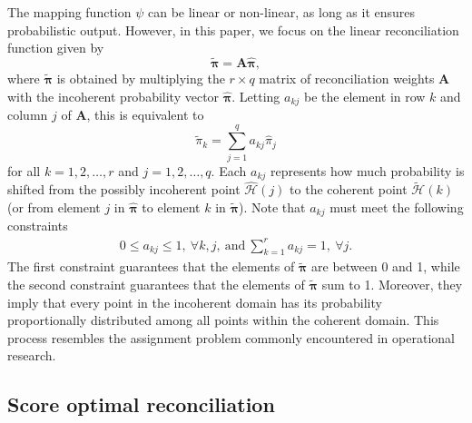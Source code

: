 \documentclass[a4paper,review,12pt,authoryear]{elsarticle}
\newcommand{\bpi}{\bm{\pi}}
\begin{document}
    The mapping function $\psi$ can be linear or non-linear, as long as it ensures probabilistic output.
    However, in this paper, we focus on the linear reconciliation function given by
    \begin{equation}
      \label{eq:framework}
    \tilde{\bpi}=\bm{A}\hat{\bpi},
    \end{equation}
    where $\tilde{\bpi}$ is obtained by multiplying the $r \times q$ matrix of reconciliation weights $\bm{A}$ with the incoherent probability vector $\hat{\bpi}$. Letting $a_{kj}$ be the element in row $k$ and column $j$ of $\bm{A}$, this is equivalent to
    \[
      \tilde{\pi}_k=\sum\limits_{j=1}^q a_{kj}\hat{{\pi}}_j
    \]
    for all $k = 1, 2, \dots, r$  and  $j = 1, 2, \dots, q$.
    Each $a_{kj}$ represents how much probability is shifted from the possibly incoherent point $\hat{\mathcal{H}}(j)$ to the coherent point $\tilde{\mathcal{H}}(k)$ (or from element $j$ in $\hat{\bpi}$ to element $k$ in $\tilde{\bpi}$). Note that $a_{kj}$ must meet the following constraints
    \begin{align*}
    0\leq a_{kj} \leq 1 , ~ \forall k, j, ~ \textrm{and} ~
    \sum\limits_{k=1}^r a_{kj} = 1 , ~ \forall j.
    \end{align*}
    The first constraint guarantees that the elements of $\tilde{\bpi}$ are between 0 and 1, while the second constraint guarantees that the elements of $\tilde{\bpi}$ sum to 1.
    Moreover, they imply that every point in the incoherent domain has its probability proportionally distributed among all points  within the coherent domain.
    This process resembles the assignment problem commonly encountered in operational research.

    \subsection{Score optimal reconciliation}
    \label{sec:algorithm}
\end{document}
